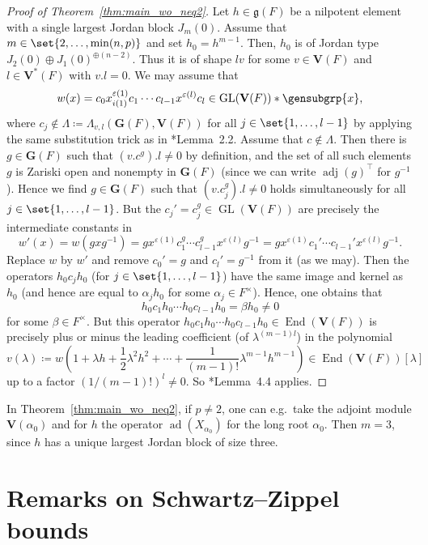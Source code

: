 \documentclass[a4paper,12pt]{amsproc}
\DeclareMathOperator{\GL}{GL}%
\DeclareMathOperator{\ad}{ad}
\DeclareMathOperator{\End}{End}
\DeclareMathOperator{\adj}{adj}
\theoremstyle{plain}
\theoremstyle{definition}
\begin{document}
\begin{proof}[Proof of Theorem~\ref{thm:main_wo_neq2}]
Let $h\in\mathfrak{g}(F)$ be a nilpotent element with a single largest Jordan block $J_m(0)$. Assume that $m\in\set{2,\ldots,\min(n,p)}$ and set $h_0=h^{m-1}$. Then, $h_0$ is of Jordan type $J_2(0)\oplus J_1(0)^{\oplus(n-2)}$. Thus it is of shape $lv$ for some $v\in\mathbf{V}(F)$ and $l\in\mathbf{V}^\ast(F)$ with $v.l=0$. We may assume that 
$$
w(x)=c_0x_{i(1)}^{\varepsilon(1)}c_1\cdots c_{l-1}x^{\varepsilon(l)}c_l\in\GL(\mathbf{V}(F))\ast\gensubgrp{x},
$$
where $c_j\notin\Lambda\coloneqq\Lambda_{v,l}(\mathbf{G}(F),\mathbf{V}(F))$ for all $j\in\set{1,\ldots,l-1}$ by applying the same substitution trick as in \cite{bradfordschneiderthom2023length}*{Lemma~2.2}. Assume that $c\notin\Lambda$. Then there is $g\in\mathbf{G}(F)$ such that $(v.c^g).l\neq 0$ by definition, and the set of all such elements $g$ is Zariski open and nonempty in $\mathbf{G}(F)$ (since we can write $\adj(g)^\top$ for $g^{-1}$). Hence we find $g\in\mathbf{G}(F)$ such that $	(v.c_j^g).l\neq 0$ holds simultaneously for all $j\in\set{1,\ldots,l-1}$. But the $c_j'=c_j^g\in\GL(\mathbf{V}(F))$ are precisely the intermediate constants in 
$$
w'(x)=w(gxg^{-1})=gx^{\varepsilon(1)}c_1^g\cdots c_{l-1}^g x^{\varepsilon(l)} g^{-1}=gx^{\varepsilon(1)}c_1'\cdots c_{l-1}'x^{\varepsilon(l)}g^{-1}.
$$ 
Replace $w$ by $w'$ and remove $c_0'=g$ and $c_l'=g^{-1}$ from it (as we may). Then the operators $h_0 c_j h_0$ (for $j\in\set{1,\ldots,l-1}$) have the same image and kernel as $h_0$ (and hence are equal to $\alpha_j h_0$ for some $\alpha_j\in F^\times$). Hence, one obtains that 
$$
h_0c_1h_0\cdots h_0c_{l-1}h_0=\beta h_0\neq 0
$$
for some $\beta\in F^\times$. But this operator $h_0c_1h_0\cdots h_0c_{l-1}h_0\in\End(\mathbf{V}(F))$ is precisely plus or minus the leading coefficient (of $\lambda^{(m-1)l}$) in the polynomial 
$$
v(\lambda)\coloneqq w\left(1+\lambda h+\frac{1}{2}\lambda^2 h^2+\cdots+\frac{1}{(m-1)!}\lambda^{m-1}h^{m-1}\right)\in\End(\mathbf{V}(F))[\lambda]
$$ 
up to a factor $(1/(m-1)!)^l\neq 0$. So \cite{bradfordschneiderthom2023length}*{Lemma~4.4} applies.
\end{proof}

In Theorem~\ref{thm:main_wo_neq2}, if $p\neq 2$, one can e.g.\ take the adjoint module $\mathbf{V}(\alpha_0)$ and for $h$ the operator $\ad(X_{\alpha_0})$ for the long root $\alpha_0$. Then $m=3$, since $h$ has a unique largest Jordan block of size three.

\section{Remarks on Schwartz--Zippel bounds}
\end{document}

